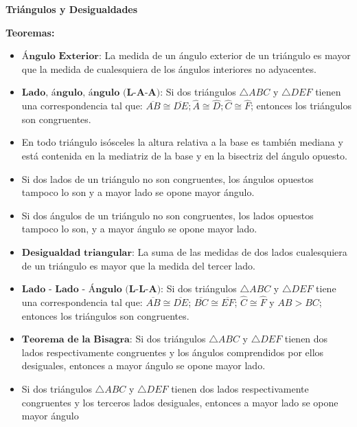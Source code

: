\documentclass[•]{article}
\begin{document}
	\begin{center}
		\Large{\textbf{Tri\'angulos y Desigualdades}}
	\end{center}

\textbf{Teoremas:}	
\begin{itemize}
	
	\item $\textbf{\'Angulo Exterior}$: La medida de un \'angulo exterior de un tri\'angulo es mayor que la medida de cualesquiera de los \'angulos interiores no adyacentes.
	\item $\textbf{Lado, \'angulo, \'angulo (L-A-A)}$: Si dos tri\'angulos $\bigtriangleup ABC$ y $\bigtriangleup DEF$ tienen una correspondencia tal que: $\overline{AB} \cong  \overline{DE}; \hat{A} \cong \hat{D}; \hat{C} \cong \hat{F}$; entonces los tri\'angulos son congruentes.
	\item En todo tri\'angulo is\'osceles la altura relativa a la base es tambi\'en mediana y est\'a contenida en la mediatriz de la base y en la bisectriz del \'angulo opuesto.
	\item Si dos lados de un tri\'angulo no son congruentes, los \'angulos opuestos tampoco lo son y a mayor lado se opone mayor \'angulo.
	\item Si dos \'angulos de un tri\'angulo no son congruentes, los lados opuestos tampoco lo son, y a mayor \'angulo se opone mayor lado.
	\item $\textbf{Desigualdad triangular}$: La suma de las medidas  de dos lados cualesquiera de un tri\'angulo es mayor que la medida del tercer lado.
	\item $\textbf{Lado - Lado - \'Angulo (L-L-A)}$: Si dos tri\'angulos $\bigtriangleup ABC$ y $\bigtriangleup DEF$ tiene una correspondencia tal que: $\overline{AB} \cong \overline{DE}$; $\overline{BC} \cong \overline{EF}$; $\hat{C} \cong \hat{F}$ y $AB > BC$; entonces los tri\'angulos son congruentes.
	\item $\textbf{Teorema de la Bisagra}$: Si dos tri\'angulos $\bigtriangleup ABC$ y $\bigtriangleup DEF$ tienen dos lados respectivamente congruentes y los \'angulos comprendidos por ellos desiguales, entonces a mayor \'angulo se opone mayor lado.
	\item Si dos tri\'angulos $\bigtriangleup ABC$ y $\bigtriangleup DEF$ tienen dos lados respectivamente congruentes y los terceros lados desiguales, entonces a mayor lado se opone mayor \'angulo

\end{itemize}
\end{document}
